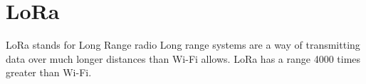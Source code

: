 \section{LoRa}

LoRa stands for Long Range radio
Long range systems are a way of transmitting data over much longer distances than
Wi-Fi allows. LoRa has a range 4000 times greater than Wi-Fi.

